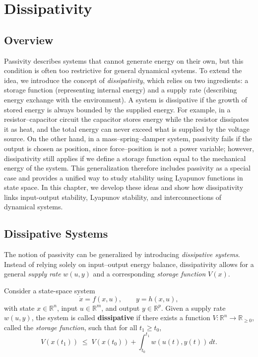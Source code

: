 \chapterspaceabove{6.75cm} %
\chapterspacebelow{7.25cm} %

\chapter{Dissipativity}
\section{Overview}
Passivity describes systems that cannot generate energy on their own, but this condition is often too restrictive for general dynamical systems. To extend the idea, we introduce the concept of \textit{dissipativity}, which relies on two ingredients: a storage function (representing internal energy) and a supply rate (describing energy exchange with the environment). A system is dissipative if the growth of stored energy is always bounded by the supplied energy. For example, in a resistor–capacitor circuit the capacitor stores energy while the resistor dissipates it as heat, and the total energy can never exceed what is supplied by the voltage source. On the other hand, in a mass–spring–damper system, passivity fails if the output is chosen as position, since force–position is not a power variable; however, dissipativity still applies if we define a storage function equal to the mechanical energy of the system. This generalization therefore includes passivity as a special case and provides a unified way to study stability using Lyapunov functions in state space. In this chapter, we develop these ideas and show how dissipativity links input-output stability, Lyapunov stability, and interconnections of dynamical systems.

\section{Dissipative Systems}

The notion of passivity can be generalized by introducing \emph{dissipative systems}.  
Instead of relying solely on input--output energy balance, dissipativity allows for a 
general \emph{supply rate} $w(u,y)$ and a corresponding \emph{storage function} $V(x)$.

\begin{definition}\label{def:dissipative}
Consider a state-space system
\[
\dot{x} = f(x,u), \qquad y = h(x,u),
\]
with state $x \in \mathbb{R}^n$, input $u \in \mathbb{R}^m$, and output $y \in \mathbb{R}^p$.  
Given a supply rate $w(u,y)$, the system is called \textbf{dissipative} if there exists a 
function $V : \mathbb{R}^n \to \mathbb{R}_{\ge 0}$, called the \emph{storage function}, such that
for all $t_1 \ge t_0$,
\begin{equation}\label{eq:dissipation}
V(x(t_1)) \;\le\; V(x(t_0)) + \int_{t_0}^{t_1} w(u(t),y(t)) \, dt.
\end{equation}
\end{definition}

